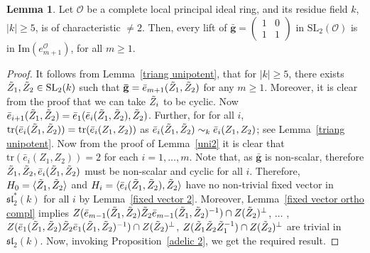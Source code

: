 \documentclass[10pt,twoside]{amsart}
\newcommand{\SL}{\mathrm{SL}}
\newcommand{\tr}{\mathrm{tr}}
\newcommand{\im}{\mathrm{Im}}
\theoremstyle{definition}
\theoremstyle{definition}
\newtheorem{lemma}[theorem]{Lemma}
\begin{document}
\begin{lemma}{\label{lifts of unipotents}}
Let $\mathcal{O}$ be a complete local principal ideal ring, and its residue field $k$, $|k|\geq 5$, is of characteristic $\neq 2$. Then, every lift of $\mathbf{\bar g} = \left(\begin{array}{cc} 1 &  0\\ 1 & 1
\end{array}\right)$ in $\SL_2(\mathcal{O})$ is in $\im (e_{m+1}^{\mathcal{O}})$, for all $m\geq 1$.
\end{lemma}
\begin{proof}
It follows from Lemma~\ref{triang unipotent}, that for $|k|\geq 5$, there exists $\Tilde{Z}_1, \Tilde{Z}_2\in \SL_2(k)$ such that $\mathbf{\bar g} = \bar e_{m+1}(\Tilde{Z}_1, \Tilde{Z}_2)$ for any $m\geq 1$. Moreover, it is clear from the proof that we can take $\Tilde{Z}_i$ to be cyclic. Now $\bar e_{i+1}(\Tilde{Z}_1, \Tilde{Z}_2) = \bar e_1(\bar e_i(\Tilde{Z}_1, \Tilde{Z}_2), \Tilde{Z}_2)$. Further, for for all $i$, $\tr(\bar e_i(\Tilde{Z}_1, \Tilde{Z}_2))=\tr (\bar e_i(Z_1, Z_2))$ as $\bar e_i(\Tilde{Z}_1, \Tilde{Z}_2) \sim_k \bar e_i(Z_1, Z_2)$; see Lemma~\ref{triang unipotent}. Now from the proof of Lemma~\ref{uni2} it is clear that $\tr(\bar e_i(Z_1, Z_2)) = 2$ for each $i=1, \ldots, m$.  Note that, as $\mathbf{\bar g}$ is non-scalar, therefore $\Tilde{Z}_1, \Tilde{Z}_2, \bar e_i(\Tilde{Z}_1,\Tilde{Z}_2)$ must be non-scalar and cyclic for all $i$. Therefore, $H_0= \langle \Tilde{Z}_1, \Tilde{Z}_2\rangle$ and $H_i=\langle \bar e_i(\Tilde{Z}_1, \Tilde{Z}_2), \Tilde{Z}_2\rangle$ have no non-trivial fixed vector in $\mathfrak{sl}_2^*(k)$ for all $i$ by Lemma~\ref{fixed vector 2}. Moreover, Lemma~\ref{fixed vector ortho compl} implies $Z(\bar e_{m-1}(\Tilde{Z}_1, \Tilde{Z}_2)\Tilde{Z}_2 \bar e_{m-1}( \Tilde{Z}_1, \Tilde{Z}_2)^{-1}) \cap Z(\Tilde{Z}_2)^{\perp}$, $\ldots$ , 
$Z(\bar e_{1}(\Tilde{Z}_1, \Tilde{Z}_2)\Tilde{Z}_2 \bar e_{1}( \Tilde{Z}_1, \Tilde{Z}_2)^{-1}) \cap Z(\Tilde{Z}_2)^{\perp}$,
$Z(\Tilde{Z}_1\Tilde{Z}_2\Tilde{Z}_1^{-1})\cap Z(\Tilde{Z}_2)^{\perp}$ are trivial in $\mathfrak{sl}_2(k)$. 
Now, invoking Proposition~\ref{adelic 2}, we get the required result.
\end{proof}
\end{document}

